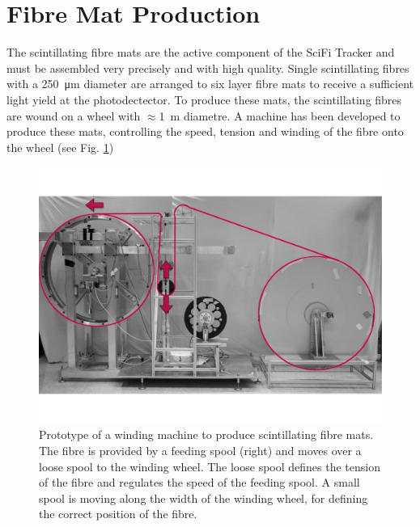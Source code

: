 \section{Fibre Mat Production}
\label{sec:Fibre Mat Production}

The scintillating fibre mats are the active component of the SciFi Tracker and must be assembled very precisely and with high quality. Single scintillating fibres with a \SI{250}{\micro\metre} diameter are arranged to six layer fibre mats to receive a sufficient light yield at the photodectector. To produce these mats, the scintillating fibres are wound on a wheel with $\approx$\SI{1}{\metre} diametre. A machine has been developed to produce these mats, controlling the speed, tension and winding of the fibre onto the wheel (see Fig. \ref{fig:SciFi:WindingMachine})
 \begin{figure}[htb]
       \begin{center}
         \includegraphics[width=0.75\linewidth]{figs/windingmachine}
       \end{center}
		\caption[Prototype of a winding machine to produce scintillating fibre mats.]{Prototype of a winding machine to produce scintillating fibre mats. The fibre is provided by a feeding spool (right) and moves over a loose spool to the winding wheel. The loose spool defines the tension of the fibre and regulates the speed of the feeding spool. A small spool is moving along the width of the winding wheel, for defining the correct position of the fibre.}
      	\label{fig:SciFi:WindingMachine}
   \end{figure}
   
